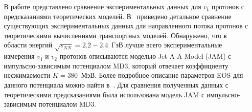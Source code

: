 В работе представлено сравнение экспериментальных данных для $v_1$ протонов с предсказаниями теоретических моделей. 
В~\cite{Parfenov:2022brq} приведено детальное сравнение существующих экспериментальных данных для направленного потока протонов с теоретическими вычислениями транспортных моделей.
Обнаружено, что в области энергий $\sqrt{s_{NN}}=2.2-2.4$~ГэВ лучше всего экспериментальные измерения $v_1$ и $v_2$ протонов описываются моделью Jet A-A Model (JAM) с импульсно-зависимым потенциалом MD3, который отвечает коэффициенту несжимаемости $K=380$~МэВ.
Более подробное описание параметров EOS для данного потенциала можно найти в~\cite{Nara:2020ztb}.
Для сравнения полученных данных с теоретическими предсказаниями была использована модель JAM с импульсно-зависимым потенциалом MD3.